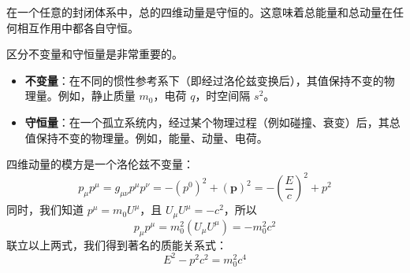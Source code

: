 \documentclass[fontset=none]{ctexart}
\begin{document}
\begin{theorem}[能量-动量守恒]
在一个任意的封闭体系中，总的四维动量是守恒的。这意味着总能量和总动量在任何相互作用中都各自守恒。
\end{theorem}

\begin{theorem}
区分不变量和守恒量是非常重要的。
\begin{itemize}
    \item \textbf{不变量}：在不同的惯性参考系下（即经过洛伦兹变换后），其值保持不变的物理量。例如，静止质量 $m_0$，电荷 $q$，时空间隔 $s^2$。
    \item \textbf{守恒量}：在一个孤立系统内，经过某个物理过程（例如碰撞、衰变）后，其总值保持不变的物理量。例如，能量、动量、电荷。
\end{itemize}
\end{theorem}

四维动量的模方是一个洛伦兹不变量：
\begin{equation}
p_{\mu}p^{\mu} = g_{\mu\nu}p^{\mu}p^{\nu} = -(p^0)^2 + (\bm{p})^2 = -(\frac{E}{c})^2 + p^2
\end{equation}
同时，我们知道 $p^{\mu} = m_0 U^{\mu}$，且 $U_{\mu}U^{\mu} = -c^2$，所以
\begin{equation}
p_{\mu}p^{\mu} = m_0^2 (U_{\mu}U^{\mu}) = -m_0^2 c^2
\end{equation}
联立以上两式，我们得到著名的质能关系式：
\begin{equation}
E^2 - p^2c^2 = m_0^2 c^4
\end{equation}
\end{document}
